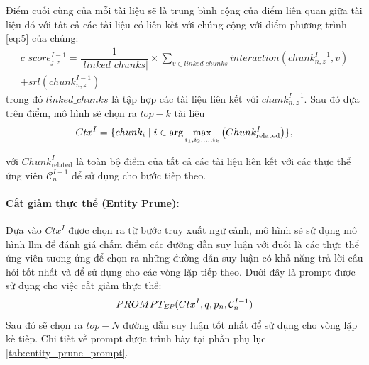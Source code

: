 Điểm cuối cùng của mỗi tài liệu sẽ là trung bình cộng của điểm liên quan giữa tài liệu đó với tất cả các tài liệu có liên kết với chúng cộng với điểm phương trình \ref{eq:5} của chúng:
\begin{equation}
    \begin{split}
        c\_score^{I-1}_{j,z} = \dfrac{1}{|linked\_chunks|}\times \sum_{v \in linked\_chunks} interaction(chunk^{I-1}_{n,z}, v) \\
        +   srl(chunk^{I-1}_{n,z})
    \end{split}
    \label{eq:7}
\end{equation}
trong đó $linked\_chunks$ là tập hợp các tài liệu liên kết với $chunk^{I-1}_{n,z}$. Sau đó dựa trên điểm, mô hình sẽ chọn ra $top-k$ tài liệu
\begin{equation}
    \centering
    Ctx^I = \{ chunk_i \mid i \in \arg\max_{i_1, i_2, \dots, i_k} \left( Chunk_\text{related}^I \right) \} ,
\end{equation}


với $Chunk_\text{related}^I$ là toàn bộ điểm của tất cả các tài liệu liên kết với các thực thể ứng viên $\mathcal{C}^{I - 1}_n$ để sử dụng cho bước tiếp theo.
\paragraph{Cắt giảm thực thể (Entity Prune):}


Dựa vào $Ctx^I$ được chọn ra từ bước truy xuất ngữ cảnh, mô hình sẽ sử dụng mô hình \gls{llm} để đánh giá chấm điểm các đường dẫn suy luận với đuôi là các thực thể ứng viên tương ứng để chọn ra những đường dẫn suy luận có khả năng trả lời câu hỏi tốt nhất và để sử dụng cho các vòng lặp tiếp theo. Dưới đây là prompt được sử dụng cho việc cắt giảm thực thể:
\begin{equation}
    PROMPT_\emph{EP}(Ctx^I, q, p_n, \mathcal{C}^{I - 1}_n)
    \label{eq:8}
\end{equation}
Sau đó sẽ chọn ra $top-N$ đường dẫn suy luận tốt nhất để sử dụng cho vòng lặp kế tiếp. Chi tiết về prompt được trình bày tại phần phụ lục \ref{tab:entity_prune_prompt}.


